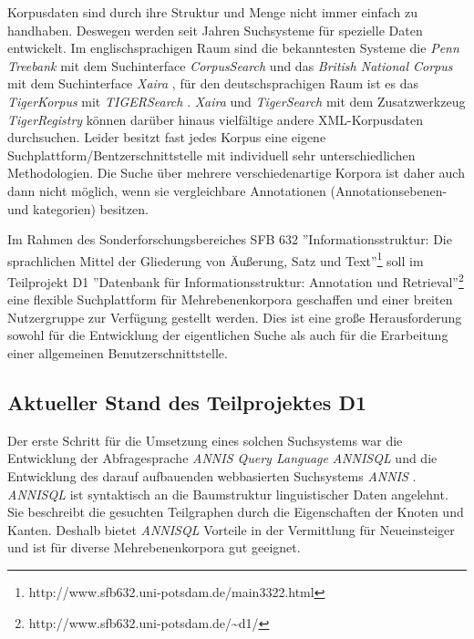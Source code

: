 Korpusdaten sind durch ihre Struktur und Menge nicht immer einfach zu handhaben. Deswegen werden seit Jahren Suchsysteme für spezielle Daten entwickelt. Im englischsprachigen Raum sind die bekanntesten Systeme die \emph{Penn Treebank} mit dem Suchinterface \emph{CorpusSearch} \citep[http://www.cis.upenn.edu/\~{}treebank/]{marcus1994building} und das \emph{British National Corpus} mit dem Suchinterface \emph{Xaira} \citep[\\ http://www.natcorp.ox.ac.uk/]{burnard2000reference}, für den deutschsprachigen Raum ist es das \emph{TigerKorpus} mit \emph{TIGERSearch} \citep[\\ http://www.ims.uni-stuttgart.de/projekte/TIGER/TIGERSearch/]{lezius-diss}. \emph{Xaira} und \emph{TigerSearch} mit dem Zusatzwerkzeug \emph{TigerRegistry} können darüber hinaus vielfältige andere XML-Korpusdaten durchsuchen. Leider besitzt fast jedes Korpus eine eigene Suchplattform/Bentzerschnittstelle mit individuell sehr unterschiedlichen Methodologien. Die Suche über mehrere verschiedenartige Korpora ist daher auch dann nicht möglich, wenn sie vergleichbare Annotationen (Annotationsebenen- und kategorien) besitzen. 

Im Rahmen des Sonderforschungsbereiches SFB 632 ''Informationsstruktur: Die sprachlichen Mittel der Gliederung von Äußerung, Satz und Text''\footnote{http://www.sfb632.uni-potsdam.de/main3322.html} soll im Teilprojekt D1 ''Datenbank für Informationsstruktur: Annotation und Retrieval''\footnote{http://www.sfb632.uni-potsdam.de/\~{ }d1/} eine flexible Suchplattform für Mehrebenenkorpora geschaffen und einer breiten Nutzergruppe zur Verfügung gestellt werden. Dies ist eine große Herausforderung sowohl für die Entwicklung der eigentlichen Suche als auch für die Erarbeitung einer allgemeinen Benutzerschnittstelle.

\subsection{Aktueller Stand des Teilprojektes D1}

Der erste Schritt für die Umsetzung eines solchen Suchsystems war die Entwicklung der Abfragesprache \emph{ANNIS Query Language} \emph{ANNISQL} und die Entwicklung des darauf aufbauenden webbasierten Suchsystems \emph{ANNIS} \citep[http://www.sfb632.uni-potsdam.de/\~{ }d1/annis/]{annis}. \emph{ANNISQL} ist syntaktisch an die Baumstruktur linguistischer Daten angelehnt. Sie beschreibt die gesuchten Teilgraphen durch die Eigenschaften der Knoten und Kanten. Deshalb bietet \emph{ANNISQL} Vorteile in der Vermittlung für Neueinsteiger und ist für diverse Mehrebenenkorpora gut geeignet.

